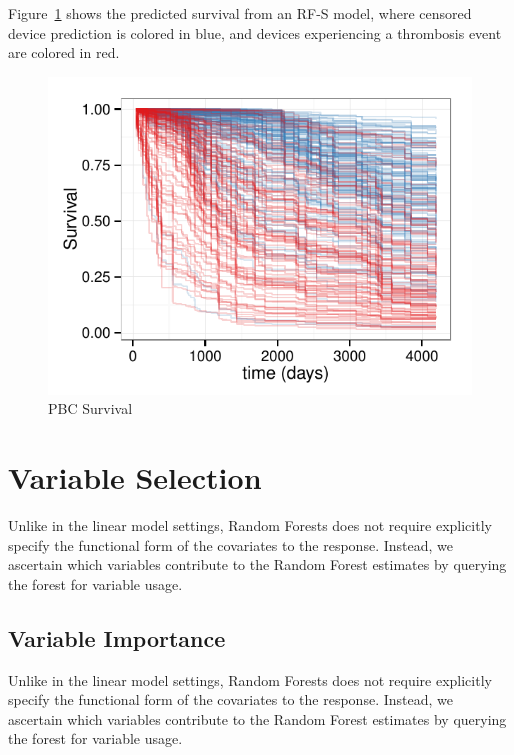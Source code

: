 \documentclass[nojss]{jss}\usepackage[]{graphicx}\usepackage[]{color}
\makeatletter
\def\maxwidth{ %
  \ifdim\Gin@nat@width>\linewidth
    \linewidth
  \else
    \Gin@nat@width
  \fi
}
\newenvironment{knitrout}{}{} %
\makeatother
\begin{document}
Figure~\ref{fig:rfsrc-plot} shows the predicted survival from an RF-S model, where censored device prediction is colored in blue, and devices experiencing a thrombosis event are colored in red.  
\begin{knitrout}\footnotesize
{}\color{fgcolor}\begin{figure}[!htpb]

{\centering \includegraphics[width=\maxwidth]{figure/rfs-rfsrc-plot-1} 

}

\caption[PBC Survival]{PBC Survival\label{fig:rfsrc-plot}}
\end{figure}


\end{knitrout}

\section{Variable Selection}
Unlike in the linear model settings, Random Forests does not require explicitly specify the functional form of the covariates to the response. Instead, we ascertain which variables contribute to the Random Forest estimates by querying the forest for variable usage. 

\subsection{Variable Importance}\label{S:vimp}
Unlike in the linear model settings, Random Forests does not require explicitly specify the functional form of the covariates to the response. Instead, we ascertain which variables contribute to the Random Forest estimates by querying the forest for variable usage. 
\end{document}
